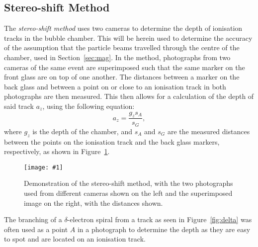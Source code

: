 \documentclass[twocolumn]{article}
\newcommand{\insertFigure}[1]{%
   \texttt{[image: \#1]}%
}
\begin{document}
\subsection{Stereo-shift Method}
The \textit{stereo-shift method} uses two cameras to determine the depth of ionisation tracks in the bubble chamber. This will be herein used to determine the accuracy of the assumption that the particle beams travelled through the centre of the chamber, used in Section~\ref{sec:mag}. In the method, photographs from two cameras of the same event are superimposed such that the same marker on the front glass are on top of one another. The distances between a marker on the back glass and between a point on or close to an ionisation track in both photographs are then measured. This then allows for a calculation of the depth of said track $a_z$, using the following equation:~\cite{seul}
\begin{equation}
a_z = \frac{g_z s_A}{s_G},
\end{equation}
where $g_z$ is the depth of the chamber, and $s_A$ and $s_G$ are the measured distances between the points on the ionisation track and the back glass markers, respectively, as shown in Figure~\ref{fig:stereo}.
\begin{figure}[!h]
	\centering
	\insertFigure{stereo.png}
	\caption{Demonstration of the stereo-shift method, with the two photographs used from different cameras shown on the left and the superimposed image on the right, with the distances shown.~\cite{seul}}
	\label{fig:stereo}
\end{figure}
The branching of a $\delta$-electron spiral from a track as seen in Figure~\ref{fig:delta} was often used as a point $A$ in a photograph to determine the depth as they are easy to spot and are located on an ionisation track.
\end{document}
